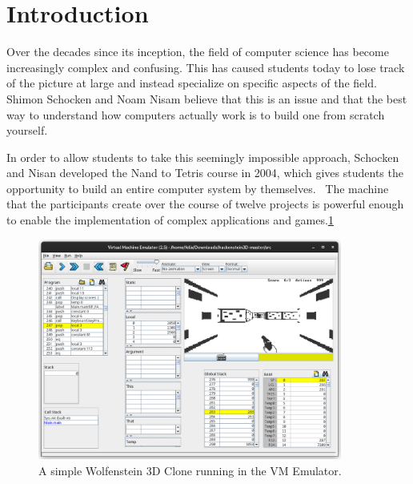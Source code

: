 \section{Introduction}
Over the decades since its inception, the field of computer science has become increasingly complex and confusing.
This has caused students today to lose track of the picture at large and instead specialize on specific aspects of the field.
Shimon Schocken and Noam Nisam believe that this is an issue and that the best way to understand how computers actually work is to build one from scratch yourself.~\cite[Preface]{nisan2005}

In order to allow students to take this seemingly impossible approach, Schocken and Nisan developed the Nand to Tetris course in 2004, which gives students the opportunity to build an entire computer system by themselves.~\cite{1408798}
The machine that the participants create over the course of twelve projects is powerful enough to enable the implementation of complex applications and games.\ref{fig:hackenstein-official}

\begin{center}
  \begin{figure}[ht]
    \centering
    \includegraphics[width=10cm]{fig/hackenstein-official.png}
    \caption{A simple Wolfenstein 3D Clone running in the VM Emulator.}%
    \label{fig:hackenstein-official}
  \end{figure}
\end{center}

